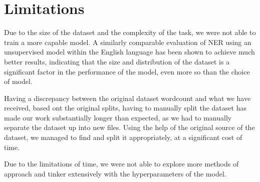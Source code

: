 \documentclass[11pt]{article}
\begin{document}
\section*{Limitations}

Due to the size of the dataset and the complexity of the task, we were not able to train a more capable model.
A similarly comparable evaluation of NER using an unsupervised model within the English language has been shown to achieve much better results,
indicating that the size and distribution of the dataset is a significant factor in the performance of the model, even more so than the choice of model.

Having a discrepancy between the original dataset wordcount and what we have received, based ont the original splits, having to
manually split the dataset has made our work substantially longer than expected, as we had to manually separate the dataset up into
new files. Using the help of the original source of the dataset, we managed to find and split it appropriately, at a significant cost of time.

Due to the limitations of time, we were not able to explore more methods of approach and tinker extensively with the hyperparameters of the model.


\end{document}
